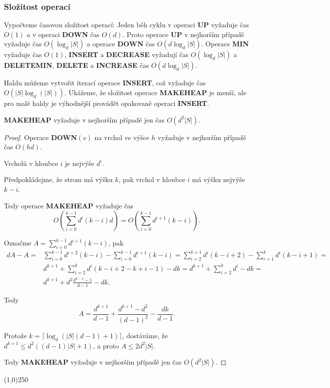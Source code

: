 \documentclass[a4paper,12pt]{article}
\newenvironment{myproof}{
  \begin{proof}
    
  }{
  \end{proof}
  \begin{center}
   \line(1,0){250}
   \end{center}
  }
\begin{document}
\subsubsection{Složitost operací}

Vypočteme časovou složitost operací:  Jeden běh cyklu 
v operaci {\bf UP} vyžaduje čas $O(1)$ a v operaci {\bf DOWN }čas $
O(d)$.  
Proto operace {\bf UP} v nejhorším případě vyžaduje čas $
O(\log_d|S|)$ 
a operace {\bf DOWN }čas $O(d\log_d|S|)$.  
Operace {\bf MIN} vyžaduje čas $O(1)$,  {\bf INSERT} a {\bf DECREASE }
vyžadu\-jí čas $O(\log_d|S|)$ a  {\bf DELETEMIN}, {\bf DELETE} a 
{\bf INCREASE }čas $O(d\log_d|S|)$.

Haldu můžeme 
vytvořit iterací operace {\bf INSERT}, což 
vyžaduje čas $O(|S|\log_d(|S|))$.  Ukáže\-me, že složitost operace 
{\bf MAKEHEAP} je menší, ale pro malé haldy je výhodnější 
provádět opakovaně operaci {\bf INSERT}.  

\begin{veta}
    {\bf MAKEHEAP} vyžaduje v nejhorším případě jen čas 
    $O(d^2|S|)$.
\end{veta}

\begin{myproof}
Operace {\bf DOWN$
(v)$} na vrchol 
ve výšce $h$ vyžaduje v nej\-horším případě čas $
O(hd)$.  

Vrcholů v hloubce $i$ je nejvýše $d^i$.  


Před\-pok\-lá\-dejme, že strom má výšku $k$, pak vrchol v 
hloubce $i$ má výšku nejvýše $k-i$.  

Tedy operace {\bf MAKEHEAP }
vyžaduje čas $$O(\sum_{i=0}^{k-1}d^i(k-i)d)=O(\sum_{i=0}^{k-
1}d^{i+1}(k-i)).$$

 Oz\-nač\-me 
$A=\sum_{i=0}^{k-1}d^{i+1}(k-i)$, pak 
\begin{align*} dA-A=&\sum_{i=0}^{k-1}d^{i+2}(k-i)-\sum_{i=0}^{k-1}d^{i+
1}(k-i)=\sum_{i=2}^{k+1}d^i(k-i+2)-\sum_{i=1}^kd^i(k-i+1)=\\
&d^{k+1}+\sum_{i=2}^kd^i(k-i+2-k+i-1)-dk=d^{k+1}+\sum_{i=2}^kd^i-
dk=\\
&d^{k+1}+d^2\frac {d^{k-1}-1}{d-1}-dk.\end{align*}

Tedy $$A=\frac {d^{k+1}}{d-1}+\frac {d^{k+1}-d^2}{(d-1)^2}-\frac {
dk}{d-1}.$$

 Protože 
$k=\lceil\log_d(|S|(d-1)+1)\rceil$, 
dostáváme, že $d^{k+1}\le d^2((d-1)|S|+1)$, a proto $A\le 
2d^2|S|$.

 Tedy 
{\bf MAKEHEAP} vyžaduje v nejhorším případě jen čas 
$O(d^2|S|)$. 
\end{myproof}
\end{document}
